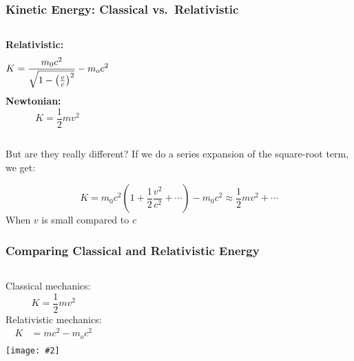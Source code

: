 \documentclass[12pt,compress,aspectratio=169]{beamer}
\newcommand{\pic}[2]{\texttt{[image: \#2]}}
\newcommand{\bigsqrt}{\ensuremath\sqrt{1-\left(\frac{v}{c}\right)^2}}
\begin{document}
\begin{frame}
  \frametitle{Kinetic Energy: Classical vs.\ Relativistic}
  \begin{columns}
    \textbf{Relativistic:}
    {\Large
      \begin{displaymath}
        K=\frac{m_0c^2}{\bigsqrt}-m_oc^2
      \end{displaymath}
    }
    \textbf{Newtonian:}
    {\Large
      \begin{displaymath}
        K=\frac{1}{2}mv^2
      \end{displaymath}
    }
  \end{columns}
  But are they really different? If we do a series expansion of the
  square-root term, we get:

  \vspace{-.35in}
  {\Large
    \begin{displaymath}
      K =
      m_0c^2
      \left(1+\frac{1}{2}\frac{v^2}{c^2}+\cdots \right) -
      m_0c^2 \approx\frac{1}{2}mv^2+\cdots
    \end{displaymath}
  }
  When $v$ is small compared to $c$
\end{frame}


\begin{frame}
  \frametitle{Comparing Classical and Relativistic Energy}
  \begin{columns}
    Classical mechanics:
    {\LARGE
      \begin{displaymath}
        K=\frac{1}{2} mv^2
      \end{displaymath}
    }
    Relativistic mechanics:
    {\LARGE
      \begin{align*}
        K&=mc^2-m_oc^2\\
      \end{align*}
    }
    \pic{1}{e_k.png}
  \end{columns}
\end{frame}

%
\end{document}
